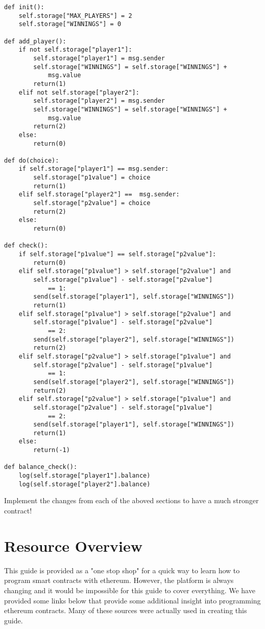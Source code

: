 \documentclass[12pt]{article}
\begin{document}
\begin{lstlisting}[frame=single]
def init():
	self.storage["MAX_PLAYERS"] = 2
	self.storage["WINNINGS"] = 0

def add_player():
	if not self.storage["player1"]:
		self.storage["player1"] = msg.sender
		self.storage["WINNINGS"] = self.storage["WINNINGS"] + 
			msg.value
		return(1)
	elif not self.storage["player2"]:
		self.storage["player2"] = msg.sender
		self.storage["WINNINGS"] = self.storage["WINNINGS"] + 
			msg.value
		return(2)
	else:
		return(0)

def do(choice):
	if self.storage["player1"] == msg.sender:
		self.storage["p1value"] = choice
		return(1)
	elif self.storage["player2"] ==  msg.sender:
		self.storage["p2value"] = choice
		return(2)
	else:
		return(0)

def check():
	if self.storage["p1value"] == self.storage["p2value"]:
		return(0)
	elif self.storage["p1value"] > self.storage["p2value"] and 
		self.storage["p1value"] - self.storage["p2value"] 
			== 1:
		send(self.storage["player1"], self.storage["WINNINGS"]) 
		return(1)
	elif self.storage["p1value"] > self.storage["p2value"] and 
		self.storage["p1value"] - self.storage["p2value"] 
			== 2:
		send(self.storage["player2"], self.storage["WINNINGS"])
		return(2)
	elif self.storage["p2value"] > self.storage["p1value"] and 
		self.storage["p2value"] - self.storage["p1value"] 
			== 1:
		send(self.storage["player2"], self.storage["WINNINGS"])		
		return(2)
	elif self.storage["p2value"] > self.storage["p1value"] and 
		self.storage["p2value"] - self.storage["p1value"] 
			== 2:
		send(self.storage["player1"], self.storage["WINNINGS"])		
		return(1)
	else:
		return(-1)

def balance_check():
	log(self.storage["player1"].balance)
	log(self.storage["player2"].balance)
\end{lstlisting}

Implement the changes from each of the aboved sections to have a much stronger contract!


\section{Resource Overview}

This guide is provided as a "one stop shop" for a quick way to learn how to program smart contracts with ethereum. However, the platform is always changing and it would be impossible for this guide to cover everything. We have provided some links below that provide some additional insight into programming ethereum contracts. Many of these sources were actually used in creating this guide. 
\end{document}
